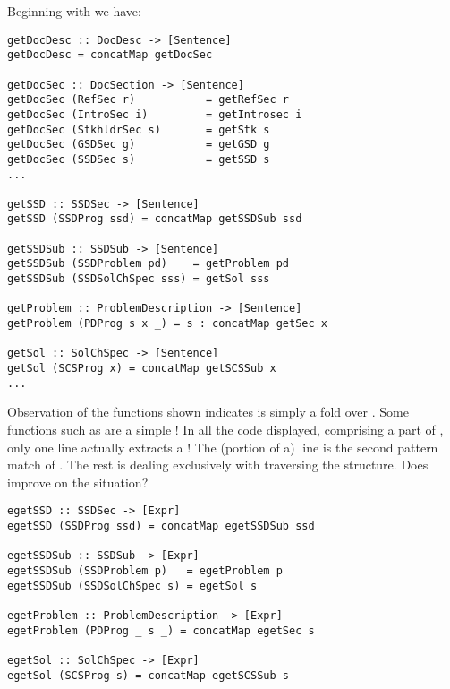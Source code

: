 Beginning with  we have:

\begin{tcolorbox}
\begin{verbatim}
getDocDesc :: DocDesc -> [Sentence]
getDocDesc = concatMap getDocSec

getDocSec :: DocSection -> [Sentence]
getDocSec (RefSec r)           = getRefSec r
getDocSec (IntroSec i)         = getIntrosec i
getDocSec (StkhldrSec s)       = getStk s
getDocSec (GSDSec g)           = getGSD g
getDocSec (SSDSec s)           = getSSD s
...

getSSD :: SSDSec -> [Sentence]
getSSD (SSDProg ssd) = concatMap getSSDSub ssd

getSSDSub :: SSDSub -> [Sentence]
getSSDSub (SSDProblem pd)    = getProblem pd
getSSDSub (SSDSolChSpec sss) = getSol sss

getProblem :: ProblemDescription -> [Sentence]
getProblem (PDProg s x _) = s : concatMap getSec x

getSol :: SolChSpec -> [Sentence]
getSol (SCSProg x) = concatMap getSCSSub x
...
\end{verbatim}
\end{tcolorbox}

Observation of the functions shown indicates  is simply a fold over . Some functions such as  are a simple ! In all the code displayed, comprising a part of , only one line actually extracts a ! The (portion of a) line is the second pattern match of . The rest is dealing exclusively with traversing the structure. Does  improve on the situation?

\begin{tcolorbox}[breakable, toprule at break=0pt, bottomrule at break=0pt]
\begin{verbatim}
egetSSD :: SSDSec -> [Expr]
egetSSD (SSDProg ssd) = concatMap egetSSDSub ssd

egetSSDSub :: SSDSub -> [Expr]
egetSSDSub (SSDProblem p)   = egetProblem p
egetSSDSub (SSDSolChSpec s) = egetSol s

egetProblem :: ProblemDescription -> [Expr]
egetProblem (PDProg _ s _) = concatMap egetSec s

egetSol :: SolChSpec -> [Expr]
egetSol (SCSProg s) = concatMap egetSCSSub s
\end{verbatim}
\end{tcolorbox}


